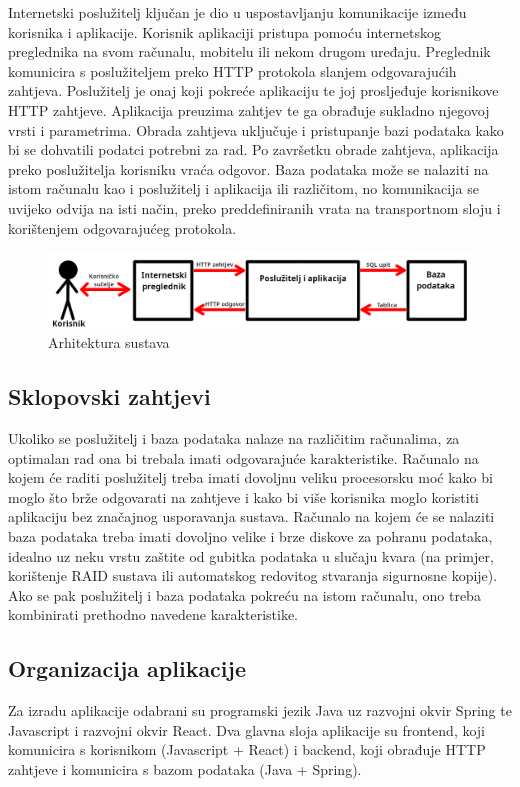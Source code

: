 				Internetski poslužitelj ključan je dio u uspostavljanju komunikacije između korisnika i aplikacije. Korisnik aplikaciji pristupa pomoću internetskog preglednika na svom računalu, mobitelu ili nekom drugom uređaju. Preglednik komunicira s poslužiteljem preko HTTP protokola slanjem odgovarajućih zahtjeva. Poslužitelj je onaj koji pokreće aplikaciju te joj prosljeđuje korisnikove HTTP zahtjeve.
				\linebreak
				Aplikacija preuzima zahtjev te ga obrađuje sukladno njegovoj vrsti i parametrima. Obrada zahtjeva uključuje i pristupanje bazi podataka kako bi se dohvatili podatci potrebni za rad. Po završetku obrade zahtjeva, aplikacija preko poslužitelja korisniku vraća odgovor.
				\linebreak
				Baza podataka može se nalaziti na istom računalu kao i poslužitelj i aplikacija ili različitom, no komunikacija se uvijeko odvija na isti način, preko preddefiniranih vrata na transportnom sloju i korištenjem odgovarajućeg protokola.
				\begin{figure}[H]
					\includegraphics[scale=1]{slike/skica_arhitekture.png}
					\centering
					\caption{Arhitektura sustava}
					\label{fig:arhitektura_sustava}
				\end{figure}
			\subsection{Sklopovski zahtjevi}
				Ukoliko se poslužitelj i baza podataka nalaze na različitim računalima, za optimalan rad ona bi trebala imati odgovarajuće karakteristike. Računalo na kojem će raditi poslužitelj treba imati dovoljnu veliku procesorsku moć kako bi moglo što brže odgovarati na zahtjeve i kako bi više korisnika moglo koristiti aplikaciju bez značajnog usporavanja sustava. Računalo na kojem će se nalaziti baza podataka treba imati dovoljno velike i brze diskove za pohranu podataka, idealno uz neku vrstu zaštite od gubitka podataka u slučaju kvara (na primjer, korištenje RAID sustava ili automatskog redovitog stvaranja sigurnosne kopije). Ako se pak poslužitelj i baza podataka pokreću na istom računalu, ono treba kombinirati prethodno navedene karakteristike.
			\subsection{Organizacija aplikacije}
				Za izradu aplikacije odabrani su programski jezik Java uz razvojni okvir Spring te Javascript i razvojni okvir React. Dva glavna sloja aplikacije su frontend, koji komunicira s korisnikom (Javascript + React) i backend, koji obrađuje HTTP zahtjeve i komunicira s bazom podataka (Java + Spring).
				
